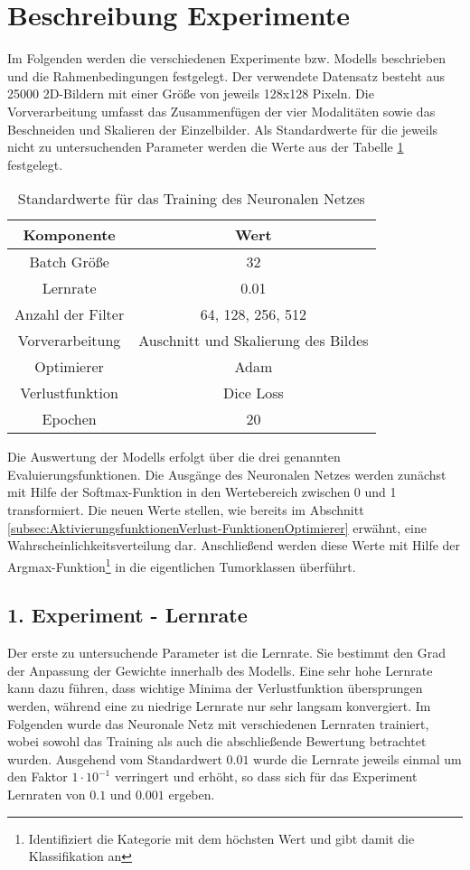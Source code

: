 \section{Beschreibung Experimente}
Im Folgenden werden die verschiedenen Experimente bzw. \glspl{Modell} beschrieben und die Rahmenbedingungen festgelegt. Der verwendete Datensatz besteht aus 25000 2D-Bildern mit einer Größe von jeweils 128x128 Pixeln. Die Vorverarbeitung umfasst das Zusammenfügen der vier Modalitäten sowie das Beschneiden und Skalieren der Einzelbilder. Als Standardwerte für die jeweils nicht zu untersuchenden Parameter werden die Werte aus der Tabelle \ref{table:StandardWerte} festgelegt.
\begin{table}[!ht]
\begin{longtable}{|c|c|}
	\hline
		\multicolumn{1}{|c|}{\textbf{Komponente}} & \multicolumn{1}{c|}{\textbf{Wert}} \\
		\endhead
	\hline
		Batch Größe & 32 \\
	\hline
		Lernrate & 0.01 \\
	\hline
		Anzahl der Filter & 64, 128, 256, 512 \\
	\hline
		Vorverarbeitung & Auschnitt und Skalierung des Bildes \\
	\hline
		Optimierer & Adam \\
	\hline
		Verlustfunktion & Dice Loss \\
	\hline
		Epochen & 20 \\
	\hline
\end{longtable}
\caption{Standardwerte für das Training des Neuronalen Netzes}
\label{table:StandardWerte}
\end{table}

Die Auswertung der \glspl{Modell} erfolgt über die drei genannten Evaluierungsfunktionen. Die Ausgänge des Neuronalen Netzes werden zunächst mit Hilfe der Softmax-Funktion in den Wertebereich zwischen 0 und 1 transformiert. Die neuen Werte stellen, wie bereits im Abschnitt \ref{subsec:AktivierungsfunktionenVerlust-FunktionenOptimierer} erwähnt, eine Wahrscheinlichkeitsverteilung dar. Anschließend werden diese Werte mit Hilfe der Argmax-Funktion\footnote{Identifiziert die Kategorie mit dem höchsten Wert und gibt damit die Klassifikation an} in die eigentlichen Tumorklassen überführt.

\subsection{1. Experiment - Lernrate}
Der erste zu untersuchende Parameter ist die Lernrate. Sie bestimmt den Grad der Anpassung der Gewichte innerhalb des \gls{Modell}s. Eine sehr hohe Lernrate kann dazu führen, dass wichtige Minima der Verlustfunktion übersprungen werden, während eine zu niedrige Lernrate nur sehr langsam konvergiert. Im Folgenden wurde das Neuronale Netz mit verschiedenen Lernraten trainiert, wobei sowohl das Training als auch die abschließende Bewertung betrachtet wurden. Ausgehend vom Standardwert $0.01$ wurde die Lernrate jeweils einmal um den Faktor $1\cdot 10^{-1}$ verringert und erhöht, so dass sich für das Experiment Lernraten von $0.1$ und $0.001$ ergeben.

